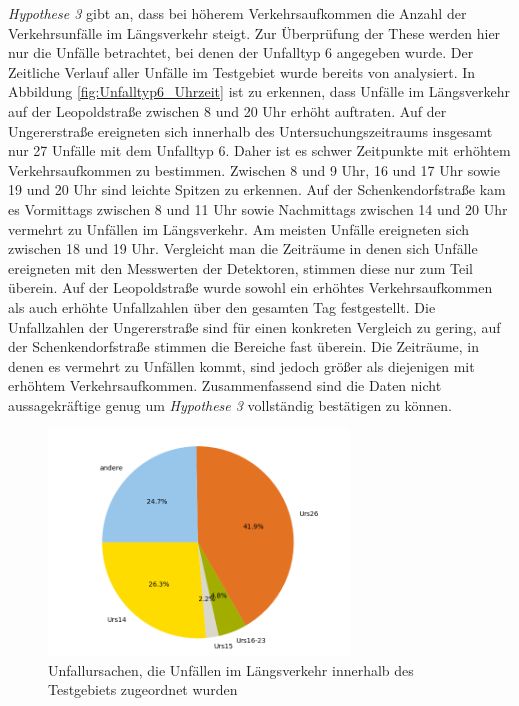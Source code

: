 \textit{Hypothese 3} gibt an, dass bei höherem Verkehrsaufkommen die Anzahl der Verkehrsunfälle im Längsverkehr steigt. Zur Überprüfung der These werden hier nur die Unfälle betrachtet, bei denen der Unfalltyp 6 angegeben wurde. Der Zeitliche Verlauf aller Unfälle im Testgebiet wurde bereits von \Textcite[S. 10-16]{Bruhn.2018} analysiert. In Abbildung \ref{fig:Unfalltyp6_Uhrzeit} ist zu erkennen, dass Unfälle im Längsverkehr auf der Leopoldstraße zwischen 8 und 20 Uhr erhöht auftraten. Auf der Ungererstraße ereigneten sich innerhalb des Untersuchungszeitraums insgesamt nur 27 Unfälle mit dem Unfalltyp 6. Daher ist es schwer Zeitpunkte mit erhöhtem Verkehrsaufkommen zu bestimmen. Zwischen 8 und 9 Uhr, 16 und 17 Uhr sowie 19 und 20 Uhr sind leichte Spitzen zu erkennen. Auf der Schenkendorfstraße kam es Vormittags zwischen 8 und 11 Uhr sowie Nachmittags zwischen 14 und 20 Uhr vermehrt zu Unfällen im Längsverkehr. Am meisten Unfälle ereigneten sich zwischen 18 und 19 Uhr. Vergleicht man die Zeiträume in denen sich Unfälle ereigneten mit den Messwerten der Detektoren, stimmen diese nur zum Teil überein. Auf der Leopoldstraße wurde sowohl ein erhöhtes Verkehrsaufkommen als auch erhöhte Unfallzahlen über den gesamten Tag festgestellt. Die Unfallzahlen der Ungererstraße sind für einen konkreten Vergleich zu gering, auf der Schenkendorfstraße stimmen die Bereiche fast überein. Die Zeiträume, in denen es vermehrt zu Unfällen kommt, sind jedoch größer als diejenigen mit erhöhtem Verkehrsaufkommen. Zusammenfassend sind die Daten nicht aussagekräftige genug um \textit{Hypothese 3} vollständig bestätigen zu können.

\begin{savenotes}
	\begin{figure}[H]
		\centering
		\includegraphics[width=8cm,height=6cm]{figures/Urs_Typ6}
		\caption[Unfallursachen, die Unfällen im Längsverkehr innerhalb des Testgebiets zugeordnet wurden]{Unfallursachen, die Unfällen im Längsverkehr innerhalb des Testgebiets zugeordnet wurden}\label{fig:Unfallursachen_Unfalltyp6}
	\end{figure}
\end{savenotes}


